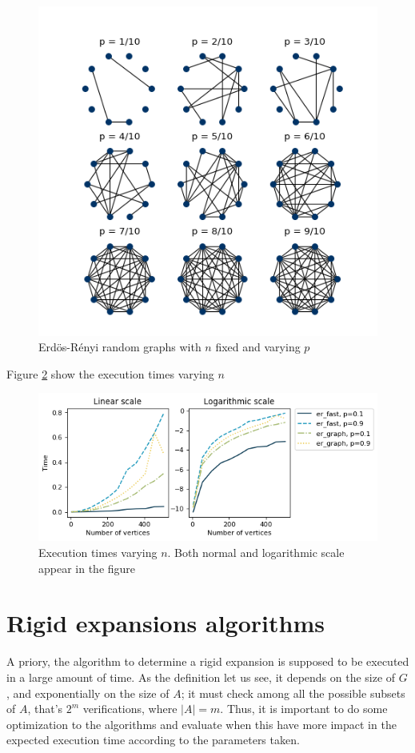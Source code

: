\begin{figure}[h]
	\centering
	\includegraphics[scale=0.85]{Figures/ER-10.png}
	\caption{Erdös-Rényi random graphs with $n$ fixed and varying $p$}
	\label{fig:ErdosRenyi10}
\end{figure}

Figure \ref{fig:tiemposER} show the execution times varying $n$
\begin{figure}[h!]
	\centering
	\includegraphics[scale=0.7]{Python/Figures/Time-execution-er-generation-algoriths.png}
	\caption{Execution times varying $n$. Both normal and logarithmic scale appear in the figure}
	\label{fig:tiemposER}
\end{figure}

\section{Rigid expansions algorithms}
A priory, the algorithm to determine a rigid expansion is supposed to be executed in a large amount of time. As the definition let us see, it depends on the size of $G$, and exponentially on the size of $A$; it must check among all the possible subsets of $A$, that's $2^{m}$ verifications, where $|A|=m$. Thus, it is important to do some optimization to the algorithms and evaluate when this have more impact in the expected execution time according to the parameters taken.


